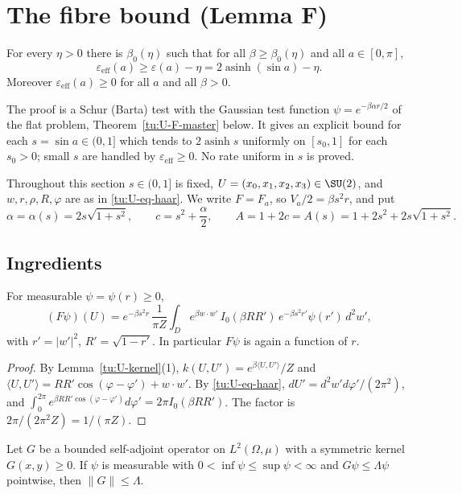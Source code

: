 \section{The fibre bound (Lemma F)}\label{tu:U-sec-F}

\begin{lemma}[Lemma F]\label{tu:U-F}
For every $\eta>0$ there is $\beta_0(\eta)$ such that for all $\beta\ge\beta_0(\eta)$ and all $a\in[0,\pi]$,
\[
\varepsilon_{\mathrm{eff}}(a)\ge\varepsilon(a)-\eta=2\operatorname{asinh}(\sin a)-\eta .
\]
Moreover $\varepsilon_{\mathrm{eff}}(a)\ge0$ for all $a$ and all $\beta>0$.
\end{lemma}

The proof is a Schur (Barta) test with the Gaussian test function $\psi=e^{-\beta\alpha r/2}$ of the flat
problem, Theorem~\ref{tu:U-F-master} below. It gives an explicit bound for each $s=\sin a\in(0,1]$ which
tends to $2\operatorname{asinh}s$ uniformly on $[s_0,1]$ for each $s_0>0$; small $s$ are handled by
$\varepsilon_{\mathrm{eff}}\ge0$. No rate uniform in $s$ is proved.

Throughout this section $s\in(0,1]$ is fixed, $U=(x_0,x_1,x_2,x_3)\in\SU(2)$, and $w,r,\rho,R,\varphi$ are as in
\eqref{tu:U-eq-haar}. We write $F=F_a$, so $V_a/2=\beta s^2r$, and put
\[
\alpha=\alpha(s)=2s\sqrt{1+s^2},\qquad c=s^2+\frac\alpha2,\qquad A=1+2c=A(s)=1+2s^2+2s\sqrt{1+s^2}.
\]

\subsection{Ingredients}

\begin{lemma}\label{tu:U-Frad}
For measurable $\psi=\psi(r)\ge0$,
\[
(F\psi)(U)=e^{-\beta s^2r}\,\frac{1}{\pi Z}\int_De^{\beta w\cdot w'}\,I_0(\beta RR')\,e^{-\beta s^2r'}\psi(r')\,d^2w',
\]
with $r'=|w'|^2$, $R'=\sqrt{1-r'}$. In particular $F\psi$ is again a function of $r$.
\end{lemma}

\begin{proof}
By Lemma~\ref{tu:U-kernel}(1), $k(U,U')=e^{\beta\langle U,U'\rangle}/Z$ and
$\langle U,U'\rangle=RR'\cos(\varphi-\varphi')+w\cdot w'$. By \eqref{tu:U-eq-haar}, $dU'=d^2w'd\varphi'/(2\pi^2)$, and
$\int_0^{2\pi}e^{\beta RR'\cos(\varphi-\varphi')}d\varphi'=2\pi I_0(\beta RR')$. The factor is $2\pi/(2\pi^2Z)=1/(\pi Z)$.
\end{proof}

\begin{lemma}\label{tu:U-barta}
Let $G$ be a bounded self-adjoint operator on $L^2(\Omega,\mu)$ with a symmetric kernel $G(x,y)\ge0$. If
$\psi$ is measurable with $0<\inf\psi\le\sup\psi<\infty$ and $G\psi\le\Lambda\psi$ pointwise, then $\|G\|\le\Lambda$.
\end{lemma}

